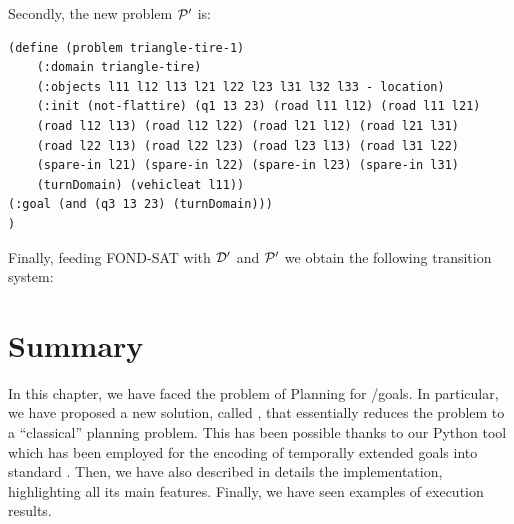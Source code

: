 Secondly, the new problem $\P'$ is:
\begin{lstlisting}[language=PDDL, escapechar=£]
(define (problem triangle-tire-1)
	(:domain triangle-tire)
	(:objects l11 l12 l13 l21 l22 l23 l31 l32 l33 - location)
	(:init (not-flattire) (q1 13 23) (road l11 l12) (road l11 l21) 
	(road l12 l13) (road l12 l22) (road l21 l12) (road l21 l31) 
	(road l22 l13) (road l22 l23) (road l23 l13) (road l31 l22) 
	(spare-in l21) (spare-in l22) (spare-in l23) (spare-in l31)
	(turnDomain) (vehicleat l11))
(:goal (and (q3 13 23) (turnDomain)))
)
\end{lstlisting}

Finally, feeding FOND-SAT with $\D'$ and $\P'$ we obtain the following transition system:


\section{Summary}
In this chapter, we have faced the problem of \FOND Planning for \LTLf/\PLTL goals. In particular, we have proposed a new solution, called \FONDFOR, that essentially reduces the problem to a ``classical'' \FOND planning problem. This has been possible thanks to our \LTLfToDFA Python tool which has been employed for the encoding of temporally extended goals into standard \PDDL. Then, we have also described in details the \FONDFOR implementation, highlighting all its main features. Finally, we have seen examples of execution results.

